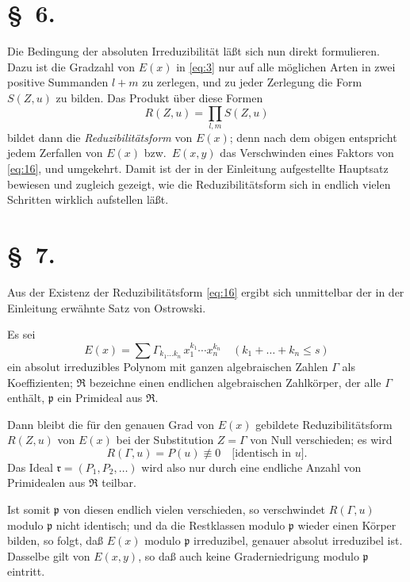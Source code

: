 \documentclass[fontsize=10pt,paper=a5,pagesize,headings=small]{scrbook}
\newcommand{\ideal}[1]{\mathfrak{#1}}
\newcommand{\ring}[1]{\mathfrak{#1}}
\theoremstyle{plain}
\begin{document}
\section*{\S~6.}
\setcounter{section}{6}

Die Bedingung der absoluten Irreduzibilität läßt sich nun direkt formulieren.
Dazu ist die Gradzahl von $E(x)$ in \eqref{eq:3} nur auf alle möglichen Arten in
zwei positive Summanden $l+m$ zu zerlegen, und zu jeder Zerlegung die Form
$S(Z,u)$ zu bilden. Das Produkt über diese Formen
\begin{equation}
\label{eq:16}
R(Z,u) = \prod_{l,m} S(Z,u)
\end{equation}
bildet dann die \textit{Reduzibilitätsform} von $E(x)$; denn nach dem obigen entspricht
jedem Zerfallen von $E(x)$ bzw.~$E(x,y)$ das Verschwinden eines Faktors von
\eqref{eq:16}, und umgekehrt. Damit ist der in der Einleitung aufgestellte Hauptsatz
bewiesen und zugleich gezeigt, wie die Reduzibilitätsform sich in endlich vielen
Schritten wirklich aufstellen läßt.

\newpage
\setcounter{page}{417}

\section*{\S~7.}
\setcounter{section}{7}

Aus der Existenz der Reduzibilitätsform \eqref{eq:16} ergibt sich unmittelbar
der in der Einleitung erwähnte Satz von Ostrowski.

Es sei
\[ E(x) = \sum \varGamma_{k_1\dots k_n}\, x_1^{k_1}\cdots x_n^{k_n} \quad (k_1+\dots+k_n \leq s) \]
ein absolut irreduzibles Polynom mit ganzen algebraischen Zahlen $\varGamma$ als
Koeffizienten; $\ring{R}$ bezeichne einen endlichen algebraischen Zahlkörper, der alle
$\varGamma$ enthält, $\ideal{p}$ ein Primideal aus $\ring{R}$.

Dann bleibt die für den genauen Grad von $E(x)$ gebildete Reduzibilitätsform
$R(Z,u)$ von $E(x)$ bei der Substitution $Z = \varGamma$ von Null verschieden; es wird
\[ R(\varGamma,u) = P(u) \not\equiv 0 \quad \text{[identisch in $u$]}. \]
Das Ideal $\ideal{r} = (P_1,P_2,\dots)$ wird also nur durch eine endliche Anzahl von
Primidealen aus $\ring{R}$ teilbar.

Ist somit $\ideal{p}$ von diesen endlich vielen verschieden, so verschwindet
$R(\varGamma,u)$ modulo $\ideal{p}$ nicht identisch; und da die Restklassen modulo $\ideal{p}$ wieder
einen Körper bilden, so folgt, daß $E(x)$ modulo $\ideal{p}$ irreduzibel, genauer absolut
irreduzibel ist. Dasselbe gilt von $E(x,y)$, so daß auch keine Graderniedrigung
modulo $\ideal{p}$ eintritt.
\end{document}
